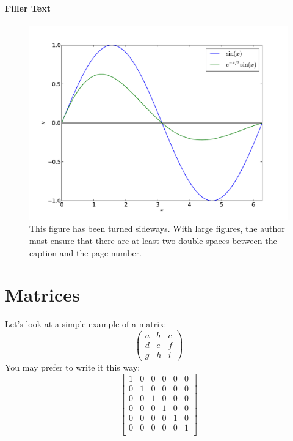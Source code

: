 \paragraph{Filler Text} \lipsum[12-15]

\begin{lscape}
\begin{figure}
\centering
\includegraphics[width=\textwidth]{Chapter-2/figs/sine}
\caption{This figure has been turned sideways.  With large figures, 
         the author must ensure that there are at least two double spaces
         between the caption and the page number.}
\label{fig:hist}
\end{figure}
\end{lscape}

\section{Matrices}
Let's look at a simple example of a matrix:
\[ \left( \begin{array}{ccc}
a & b & c \\
d & e & f \\
g & h & i \end{array} \right)\] 
%
You may prefer to write it this way:
\[ \left[\begin{array} {cccccc}
1 & 0 & 0 & 0 & 0 & 0 \\
0 & 1 & 0 & 0 & 0 & 0 \\
0 & 0 & 1 & 0 & 0 & 0 \\
0 & 0 & 0 & 1 & 0 & 0 \\
0 & 0 & 0 & 0 & 1 & 0 \\
0 & 0 & 0 & 0 & 0 & 1 \\
\end{array} \right] \]
